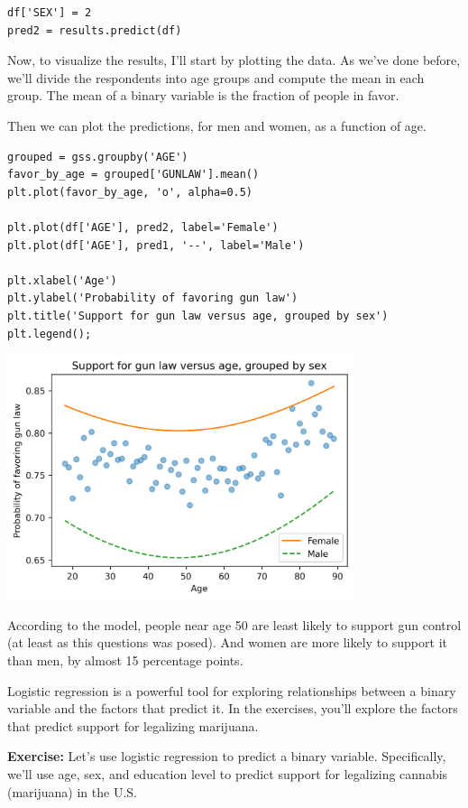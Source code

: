 \begin{lstlisting}[]
df['SEX'] = 2
pred2 = results.predict(df)
\end{lstlisting}

Now, to visualize the results, I'll start by plotting the data. As we've
done before, we'll divide the respondents into age groups and compute
the mean in each group. The mean of a binary variable is the fraction of
people in favor.

Then we can plot the predictions, for men and women, as a function of
age.

\begin{lstlisting}[]
grouped = gss.groupby('AGE')
favor_by_age = grouped['GUNLAW'].mean()
plt.plot(favor_by_age, 'o', alpha=0.5)

plt.plot(df['AGE'], pred2, label='Female')
plt.plot(df['AGE'], pred1, '--', label='Male')

plt.xlabel('Age')
plt.ylabel('Probability of favoring gun law')
plt.title('Support for gun law versus age, grouped by sex')
plt.legend();
\end{lstlisting}

\begin{center}
\includegraphics[width=4in]{10_regression_files/10_regression_83_0.png}
\end{center}

According to the model, people near age 50 are least likely to support
gun control (at least as this questions was posed). And women are more
likely to support it than men, by almost 15 percentage points.

Logistic regression is a powerful tool for exploring relationships
between a binary variable and the factors that predict it. In the
exercises, you'll explore the factors that predict support for
legalizing marijuana.

\textbf{Exercise:} Let's use logistic regression to predict a binary
variable. Specifically, we'll use age, sex, and education level to
predict support for legalizing cannabis (marijuana) in the U.S.


